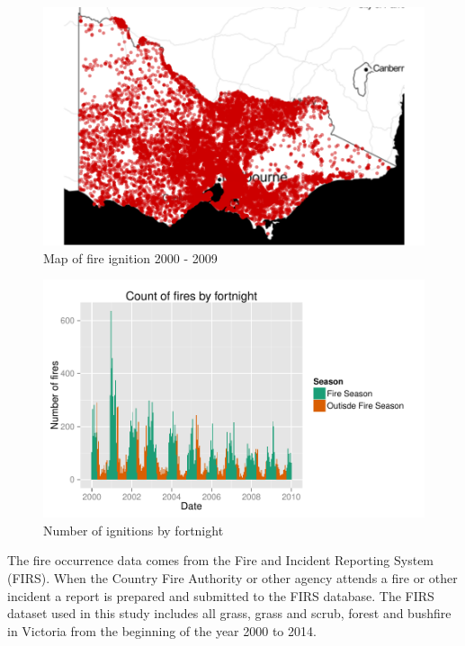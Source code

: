 \documentclass[11pt,a4paper]{article}
\begin{document}
\begin{figure}
  \centering
	\includegraphics[width=1\columnwidth]{figures/firemap.pdf}
  \caption{Map of fire ignition 2000 - 2009}
  \label{fig:firemap}
\end{figure}

\begin{figure}
  \centering
	\includegraphics[width=1\columnwidth]{figures/occurence.pdf}
  \caption{Number of ignitions by fortnight}
  \label{fig:occ}
\end{figure}

The fire occurrence data comes from the Fire and Incident Reporting System (FIRS). When the Country Fire Authority or other agency attends a fire or other incident a report is prepared and submitted to the FIRS database. The FIRS dataset used in this study includes all grass, grass and scrub, forest and bushfire in Victoria from the beginning of the year 2000 to 2014.
\end{document}
